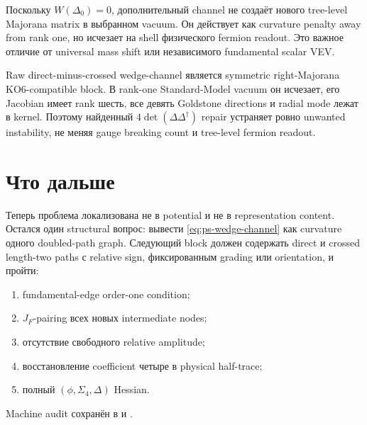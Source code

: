 Поскольку \(W(\Delta_0)=0\), дополнительный channel не создаёт нового
tree-level Majorana matrix в выбранном vacuum. Он действует как curvature
penalty away from rank one, но исчезает на shell физического fermion
readout. Это важное отличие от universal mass shift или независимого
fundamental scalar VEV.

\begin{theorem}
Raw direct-minus-crossed wedge-channel является symmetric right-Majorana
KO6-compatible block. В rank-one Standard-Model vacuum он исчезает, его
Jacobian имеет rank шесть, все девять Goldstone directions и radial mode
лежат в kernel. Поэтому найденный \(4\det(\Delta\Delta^\dagger)\) repair
устраняет ровно unwanted instability, не меняя gauge breaking count и
tree-level fermion readout.
\end{theorem}

\section{Что дальше}

Теперь проблема локализована не в potential и не в representation content.
Остался один structural вопрос: вывести \eqref{eq:ps-wedge-channel} как
curvature одного doubled-path graph. Следующий block должен содержать direct
и crossed length-two paths с relative sign, фиксированным grading или
orientation, и пройти:
\begin{enumerate}
 \item fundamental-edge order-one condition;
 \item \(J_F\)-pairing всех новых intermediate nodes;
 \item отсутствие свободного relative amplitude;
 \item восстановление coefficient четыре в physical half-trace;
 \item полный \((\phi,\Sigma_4,\Delta)\) Hessian.
\end{enumerate}

Machine audit сохранён в
 и
.
